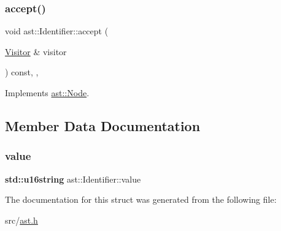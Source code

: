 \subsubsection{\texorpdfstring{accept()}{accept()}}
{\footnotesize\ttfamily void ast\+::\+Identifier\+::accept (\begin{DoxyParamCaption}\item[{\hyperlink{structast_1_1_visitor}{Visitor} \&}]{visitor }\end{DoxyParamCaption}) const\hspace{0.3cm}{\ttfamily [inline]}, {\ttfamily [override]}, {\ttfamily [virtual]}}



Implements \hyperlink{structast_1_1_node_abc089ee6caaf06a4445ebdd8391fdebc}{ast\+::\+Node}.



\subsection{Member Data Documentation}
\mbox{\label{structast_1_1_identifier_a94073f3af4a0e4accf4dfd4efb8e572e}} 
\subsubsection{\texorpdfstring{value}{value}}
{\footnotesize\ttfamily \textbf{ std\+::u16string} ast\+::\+Identifier\+::value}



The documentation for this struct was generated from the following file\+:\begin{DoxyCompactItemize}
\item 
src/\hyperlink{ast_8h}{ast.\+h}\end{DoxyCompactItemize}
